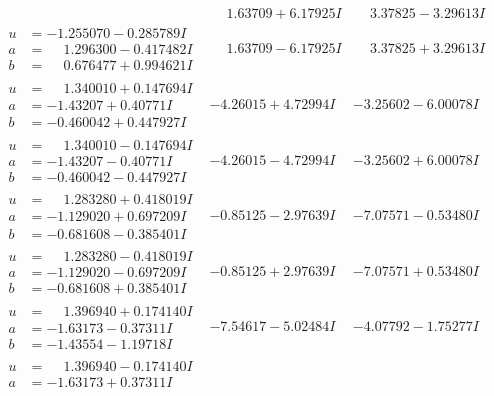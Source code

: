 \documentclass[1p]{elsarticle_modified}
\theoremstyle{definition}
\begin{document}
$$\begin{array}{c|c|c}
 & \phantom{-}1.63709 + 6.17925 I & \phantom{-}3.37825 - 3.29613 I \\ \hline\begin{aligned}
u &= -1.255070 - 0.285789 I \\
a &= \phantom{-}1.296300 - 0.417482 I \\
b &= \phantom{-}0.676477 + 0.994621 I\end{aligned}
 & \phantom{-}1.63709 - 6.17925 I & \phantom{-}3.37825 + 3.29613 I \\ \hline\begin{aligned}
u &= \phantom{-}1.340010 + 0.147694 I \\
a &= -1.43207 + 0.40771 I \\
b &= -0.460042 + 0.447927 I\end{aligned}
 & -4.26015 + 4.72994 I & -3.25602 - 6.00078 I \\ \hline\begin{aligned}
u &= \phantom{-}1.340010 - 0.147694 I \\
a &= -1.43207 - 0.40771 I \\
b &= -0.460042 - 0.447927 I\end{aligned}
 & -4.26015 - 4.72994 I & -3.25602 + 6.00078 I \\ \hline\begin{aligned}
u &= \phantom{-}1.283280 + 0.418019 I \\
a &= -1.129020 + 0.697209 I \\
b &= -0.681608 - 0.385401 I\end{aligned}
 & -0.85125 - 2.97639 I & -7.07571 - 0.53480 I \\ \hline\begin{aligned}
u &= \phantom{-}1.283280 - 0.418019 I \\
a &= -1.129020 - 0.697209 I \\
b &= -0.681608 + 0.385401 I\end{aligned}
 & -0.85125 + 2.97639 I & -7.07571 + 0.53480 I \\ \hline\begin{aligned}
u &= \phantom{-}1.396940 + 0.174140 I \\
a &= -1.63173 - 0.37311 I \\
b &= -1.43554 - 1.19718 I\end{aligned}
 & -7.54617 - 5.02484 I & -4.07792 - 1.75277 I \\ \hline\begin{aligned}
u &= \phantom{-}1.396940 - 0.174140 I \\
a &= -1.63173 + 0.37311 I \\

\end{aligned}
\end{array}$$
\end{document}
